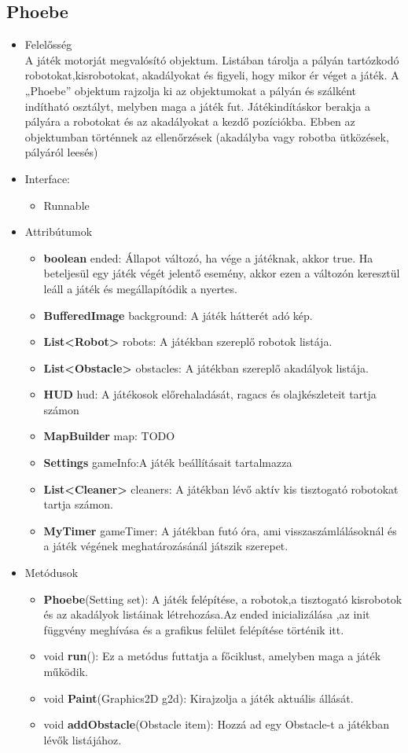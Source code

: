 \subsection{Phoebe}
\begin{itemize}
\item Felelősség\\
A játék motorját megvalósító objektum. Listában tárolja a pályán tartózkodó robotokat,kisrobotokat, akadályokat és 
 figyeli, hogy mikor ér véget a játék. A „Phoebe” objektum rajzolja ki az objektumokat a pályán és 
 szálként indítható osztályt, melyben maga a játék fut. Játékindításkor berakja a pályára a robotokat és 
 az akadályokat a kezdő pozíciókba. Ebben az objektumban történnek az ellenőrzések (akadályba vagy 
  robotba ütközések, pályáról leesés)
  \item Interface:
  \begin{itemize}
  \item Runnable
  \end{itemize}
\item Attribútumok
	\begin{itemize}
		\item \textbf{boolean} ended: Állapot változó, ha vége a játéknak, akkor true. Ha beteljesül egy játék végét jelentő esemény, akkor ezen a változón keresztül leáll a játék és megállapítódik a nyertes.
		\item \textbf{BufferedImage} background: A játék hátterét adó kép.
		\item \textbf{List<Robot>} robots: A játékban szereplő robotok listája.
		\item \textbf{List<Obstacle>} obstacles: A játékban szereplő akadályok listája.
		\item \textbf{HUD} hud: A játékosok előrehaladását, ragacs és olajkészleteit tartja számon
		\item \textbf{MapBuilder} map: TODO
		\item \textbf{Settings} gameInfo:A játék beállításait tartalmazza         \item \textbf{List<Cleaner>} cleaners: A játékban lévő aktív kis tisztogató robotokat tartja számon.
        \item \textbf{MyTimer} gameTimer: A játékban futó óra, ami visszaszámlálásoknál és a játék végének meghatározásánál játszik szerepet.

		
			
	\end{itemize}
\item Metódusok
	\begin{itemize}
		\item \textbf{Phoebe}(Setting set): A játék felépítése, a robotok,a tisztogató kisrobotok és  az akadályok listáinak létrehozása.Az ended inicializálása ,az init függvény meghívása és a grafikus felület felépítése történik itt.
		\item void \textbf{run}(): Ez a metódus futtatja a főciklust, amelyben maga a játék működik.
	\item void \textbf{Paint}(Graphics2D g2d): Kirajzolja a játék aktuális állását. 
	\item void \textbf{addObstacle}(Obstacle item): Hozzá ad egy Obstacle-t a játékban lévők listájához.
	

\end{itemize}
\end{itemize}
